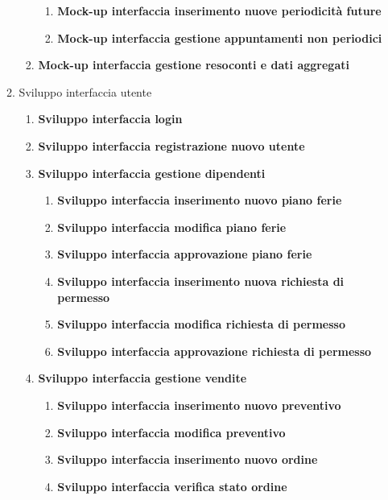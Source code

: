 \documentclass{article}
\begin{document}
\begin{enumerate}
\begin{enumerate}
\begin{enumerate}
\begin{enumerate}
                    \item \textbf{Mock-up interfaccia inserimento nuove periodicità future}
                    \item \textbf{Mock-up interfaccia gestione appuntamenti non periodici}
                \end{enumerate}
                \item \textbf{Mock-up interfaccia gestione resoconti e dati aggregati}
            \end{enumerate}
            \item Sviluppo interfaccia utente
            \begin{enumerate}
                \item \textbf{Sviluppo interfaccia login}
                \item \textbf{Sviluppo interfaccia registrazione nuovo utente}
                \item \textbf{Sviluppo interfaccia gestione dipendenti}
                \begin{enumerate}
                    \item \textbf{Sviluppo interfaccia inserimento nuovo piano ferie}
                    \item \textbf{Sviluppo interfaccia modifica piano ferie}
                    \item \textbf{Sviluppo interfaccia approvazione piano ferie}
                    \item \textbf{Sviluppo interfaccia inserimento nuova richiesta di permesso}
                    \item \textbf{Sviluppo interfaccia modifica richiesta di permesso}
                    \item \textbf{Sviluppo interfaccia approvazione richiesta di permesso}
                \end{enumerate}
                \item \textbf{Sviluppo interfaccia gestione vendite}
                \begin{enumerate}
                    \item \textbf{Sviluppo interfaccia inserimento nuovo preventivo}
                    \item \textbf{Sviluppo interfaccia modifica preventivo}
                    \item \textbf{Sviluppo interfaccia inserimento nuovo ordine}
                    \item \textbf{Sviluppo interfaccia verifica stato ordine}
                \end{enumerate}

\end{enumerate}
\end{enumerate}
\end{enumerate}
\end{document}
